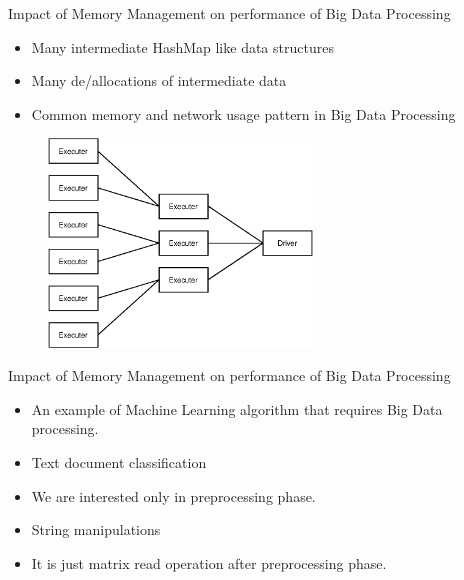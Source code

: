 \documentclass[9pt]{beamer}
\begin{document}
\begin{frame}[fragile]{Impact of Memory Management on performance of Big Data Processing}
\begin{itemize}
    \item Many intermediate HashMap like data structures
    \item Many de/allocations of intermediate data
    \item Common memory and network usage pattern in Big Data Processing
\end{itemize}

\begin{figure}[htb]
    \begin{minipage}[t]{0.5\linewidth}\centering
        \includegraphics[width=7cm]{images/tree_agg.eps} 
    \end{minipage}
\end{figure}

\end{frame}

\begin{frame}[fragile]{Impact of Memory Management on performance of Big Data Processing}
    \begin{itemize}
        \item An example of Machine Learning algorithm that requires Big Data processing.
        \item Text document classification 
        \item We are interested only in preprocessing phase.
        \item String manipulations
        \item It is just matrix read operation after preprocessing phase.
    \end{itemize}    

\end{frame}
\end{document}
